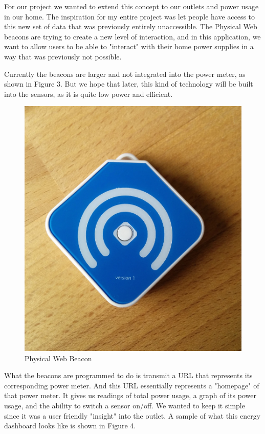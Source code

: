 \documentclass{sig-alternate-05-2015}
\begin{document}
For our project we wanted to extend this concept to our outlets and power usage in our home. The inspiration for my entire project was let people have access to this new set of data that was previously entirely unaccessible. The Physical Web beacons are trying to create a new level of interaction, and in this application, we want to allow users to be able to "interact" with their home power supplies in a way that was previously not possible.

Currently the beacons are larger and not integrated into the power meter, as shown in Figure 3. But we hope that later, this kind of technology will be built into the sensors, as it is quite low power and efficient.

\begin{figure}
	\centering
	\includegraphics[scale=.1]{phys}
	\caption{Physical Web Beacon\cite{physweb}}
\end{figure}

What the beacons are programmed to do is transmit a URL that represents its corresponding power meter. And this URL essentially represents a "homepage" of that power meter. It gives us readings of total power usage, a graph of its power usage, and the ability to switch a sensor on/off. We wanted to keep it simple since it was a user friendly "insight" into the outlet. A sample of what this energy dashboard looks like is shown in Figure 4.
\end{document}
